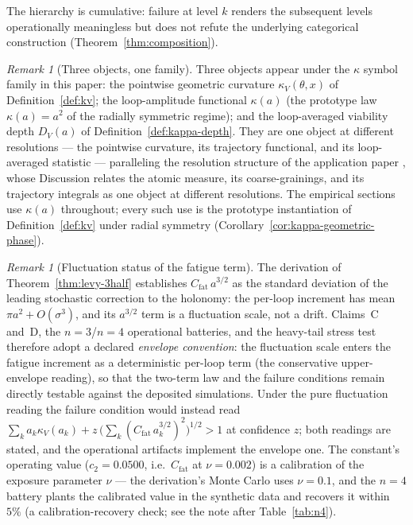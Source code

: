 \documentclass[11pt,a4paper]{article}
\theoremstyle{plain}
\theoremstyle{definition}
\theoremstyle{remark}
\newtheorem{remark}[theorem]{Remark}
\newcommand{\kk}{\kappa_{\!V}}
\begin{document}
The hierarchy is cumulative: failure at level $k$ renders the
subsequent levels operationally meaningless but does not refute the
underlying categorical construction (Theorem~\ref{thm:composition}).

\begin{remark}[Three objects, one family]
\label{rem:kappa-family}
Three objects appear under the $\kappa$ symbol family in this paper:
the pointwise geometric curvature $\kk(\theta,x)$ of
Definition~\ref{def:kv}; the loop-amplitude functional $\kappa(a)$
(the prototype law $\kappa(a)=a^{2}$ of the radially symmetric
regime); and the loop-averaged viability depth $D_V(a)$ of
Definition~\ref{def:kappa-depth}. They are one object at different
resolutions --- the pointwise curvature, its trajectory functional,
and its loop-averaged statistic --- paralleling the resolution
structure of the application paper \citep{zai2026measure},
whose Discussion relates the atomic measure, its coarse-grainings,
and its trajectory integrals as one object at different
resolutions. The empirical sections use $\kappa(a)$ throughout;
every such use is the prototype instantiation of
Definition~\ref{def:kv} under radial symmetry
(Corollary~\ref{cor:kappa-geometric-phase}).
\end{remark}

\begin{remark}[Fluctuation status of the fatigue term]
\label{rem:fatigue-convention}
The derivation of Theorem~\ref{thm:levy-3half} establishes
$C_{\mathrm{fat}}\,a^{3/2}$ as the standard deviation of the leading
stochastic correction to the holonomy: the per-loop increment has
mean $\pi a^{2}+O(\sigma^{3})$, and its $a^{3/2}$ term is a
fluctuation scale, not a drift. Claims~C and~D, the $n=3$/$n=4$
operational batteries, and the heavy-tail stress test therefore
adopt a declared \emph{envelope convention}: the fluctuation scale
enters the fatigue increment as a deterministic per-loop term (the
conservative upper-envelope reading), so that the two-term law and
the failure conditions remain directly testable against the
deposited simulations. Under the pure fluctuation reading the
failure condition would instead read
$\sum_k a_k\kk(a_k) + z\,\bigl(\sum_k
(C_{\mathrm{fat}}\,a_k^{3/2})^{2}\bigr)^{1/2} > 1$ at confidence
$z$; both readings are stated, and the operational artifacts
implement the envelope one. The constant's operating value
($c_2=0.0500$, i.e.\ $C_{\mathrm{fat}}$ at $\nu=0.002$) is a
calibration of the exposure parameter $\nu$ --- the derivation's
Monte Carlo uses $\nu=0.1$, and the $n=4$ battery plants the
calibrated value in the synthetic data and recovers it within
$5\%$ (a calibration-recovery check; see the note after
Table~\ref{tab:n4}).
\end{remark}
\end{document}
